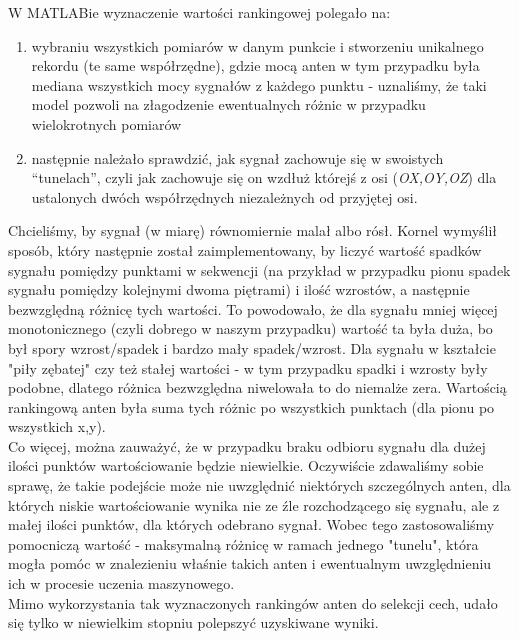 \documentclass{article}
\begin{document}
W MATLABie wyznaczenie wartości rankingowej polegało na:\\
\begin{enumerate}
\item
wybraniu wszystkich pomiarów w danym punkcie i stworzeniu unikalnego rekordu (te same współrzędne), gdzie mocą anten w tym przypadku była mediana wszystkich mocy sygnałów z każdego punktu - uznaliśmy, że taki model pozwoli na złagodzenie ewentualnych różnic w przypadku wielokrotnych pomiarów
\item
następnie należało sprawdzić, jak sygnał zachowuje się w swoistych “tunelach”, czyli jak zachowuje się on wzdłuż którejś z osi (\textit{OX,OY,OZ}) dla ustalonych dwóch współrzędnych niezależnych od przyjętej osi.\\
\end{enumerate}
Chcieliśmy, by sygnał (w miarę) równomiernie malał albo rósł. Kornel wymyślił sposób, który następnie został zaimplementowany, by liczyć wartość spadków sygnału pomiędzy punktami w sekwencji (na przykład w przypadku pionu spadek sygnału pomiędzy kolejnymi dwoma piętrami) i ilość wzrostów, a następnie bezwzględną różnicę tych wartości. To powodowało, że dla sygnału mniej więcej monotonicznego (czyli dobrego w naszym przypadku) wartość ta była duża, bo był spory wzrost/spadek i bardzo mały spadek/wzrost. Dla sygnału w kształcie "piły zębatej" czy też stałej wartości - w tym przypadku spadki i wzrosty były podobne, dlatego różnica bezwzględna niwelowała to do niemalże zera. Wartością rankingową anten była suma tych różnic po wszystkich punktach (dla pionu po wszystkich x,y).\\
Co więcej, można zauważyć, że w przypadku braku odbioru sygnału dla dużej ilości punktów wartościowanie będzie niewielkie.
Oczywiście zdawaliśmy sobie sprawę, że takie podejście może nie uwzględnić niektórych szczególnych anten, dla których niskie wartościowanie wynika nie ze źle rozchodzącego się sygnału, ale z małej ilości punktów, dla których odebrano sygnał.
Wobec tego zastosowaliśmy pomocniczą wartość - maksymalną różnicę w ramach jednego "tunelu", która mogła pomóc w znalezieniu właśnie takich anten i ewentualnym uwzględnieniu ich w procesie uczenia maszynowego.
\\

Mimo wykorzystania tak wyznaczonych rankingów anten do selekcji cech, udało się tylko w niewielkim stopniu polepszyć uzyskiwane wyniki.

\end{document}
